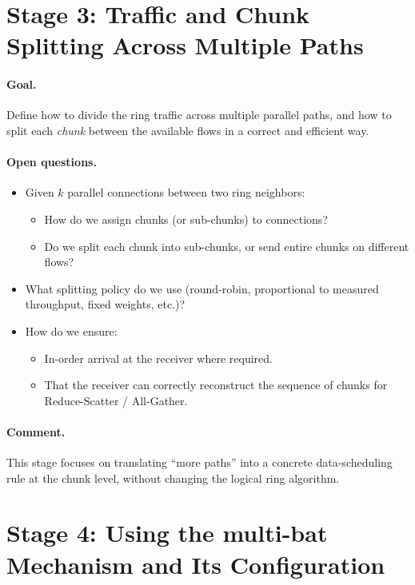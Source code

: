 \documentclass[12pt]{article}
\begin{document}
\newpage
\section*{Stage 3: Traffic and Chunk Splitting Across Multiple Paths}

\paragraph{Goal.}
Define how to divide the ring traffic across multiple parallel paths, and how to split each \emph{chunk} between the available flows in a correct and efficient way.

\paragraph{Open questions.}
\begin{itemize}[leftmargin=*]
  \item Given $k$ parallel connections between two ring neighbors:
        \begin{itemize}
            \item How do we assign chunks (or sub-chunks) to connections?
            \item Do we split each chunk into sub-chunks, or send entire chunks on different flows?
        \end{itemize}
  \item What splitting policy do we use (round-robin, proportional to measured throughput, fixed weights, etc.)?
  \item How do we ensure:
        \begin{itemize}
            \item In-order arrival at the receiver where required.
            \item That the receiver can correctly reconstruct the sequence of chunks for Reduce-Scatter / All-Gather.
        \end{itemize}
\end{itemize}

\paragraph{Comment.}
This stage focuses on translating ``more paths'' into a concrete data-scheduling rule at the chunk level, without changing the logical ring algorithm.

\newpage
\section*{Stage 4: Using the multi-bat Mechanism and Its Configuration}
\end{document}

